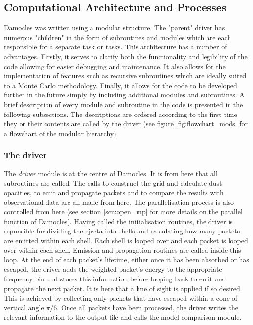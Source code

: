 	
	\subsection{Computational Architecture and Processes}



	
	Damocles was written using a modular structure.  The "parent" driver has numerous "children" in the form of subroutines and modules which are each responsible for a separate task or tasks.  This architecture has a number of advantages.  Firstly, it serves to clarify both the functionality and legibility of the code allowing for easier debugging and maintenance.  It also allows for the implementation of features such as recursive subroutines which are ideally suited to a Monte Carlo methodology.  Finally, it allows for the code to be developed further in the future simply by including additional modules and subroutines.  A brief description of every module and subroutine in the code is presented in the following subsections.  The descriptions are ordered according to the first time they or their contents are called by the driver (see figure \ref{fig:flowchart_mods} for a flowchart of the modular hierarchy).
	

		\subsubsection{The driver}
		The \textit{driver} module is at the centre of Damocles.  It is from here that all subroutines are called.  The calls to construct the grid and calculate dust opacities, to emit and propagate packets and to compare the results with observational data are all made from here.  The parallelisation process is also controlled from here (see section \ref{scn:open_mp} for more details on the parallel function of Damocles).  Having called the initialisation routines, the driver is reponsible for dividing the ejecta into shells and calculating how many packets are emitted within each shell.  Each shell is looped over and each packet is looped over within each shell. Emission and propagation routines are called inside this loop.  At the end of each packet's lifetime, either once it has been absorbed or has escaped, the driver adds the weighted packet's energy to the appropriate frequency bin and stores this information before looping back to emit and propagate the next packet.  It is here that a line of sight is applied if so desired.  This is achieved by collecting only packets that have escaped within a cone of vertical angle $\pi/6$.  Once all packets have been processed, the driver writes the relevant information to the output file and calls the model comparison module.  
	
